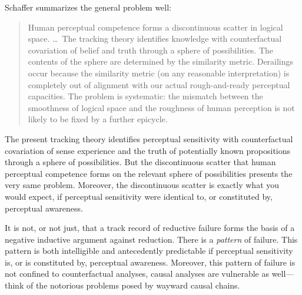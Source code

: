 \documentclass[12pt]{article}
\begin{document}
Schaffer summarizes the general problem well:
\begin{quote}
    Human perceptual competence forms a discontinuous scatter in logical space. \ldots\ The tracking theory identifies knowledge with counterfactual covariation of belief and truth through a sphere of possibilities. The contents of the sphere are determined by the similarity metric. Derailings occur because the similarity metric (on any reasonable interpretation) is completely out of alignment with our actual rough-and-ready perceptual capacities. The problem is systematic: the mismatch between the smoothness of logical space and the roughness of human perception is not likely to be fixed by a further epicycle. \citep[42]{Schaffer:2003vn}
\end{quote}
The present tracking theory identifies perceptual sensitivity with counterfactual covariation of sense experience and the truth of potentially known propositions through a sphere of possibilities. But the discontinuous scatter that human perceptual competence forms on the relevant sphere of possibilities presents the very same problem. Moreover, the discontinuous scatter is exactly what you would expect, if perceptual sensitivity were identical to, or constituted by, perceptual awareness. 

It is not, or not just, that a track record of reductive failure forms the basis of a negative inductive argument against reduction. There is a \emph{pattern} of failure. This pattern is both intelligible and antecedently predictable if perceptual sensitivity is, or is constituted by, perceptual awareness. Moreover, this pattern of failure is not confined to counterfactual analyses, causal analyses are vulnerable as well---think of the notorious problems posed by wayward causal chains.
\end{document}
